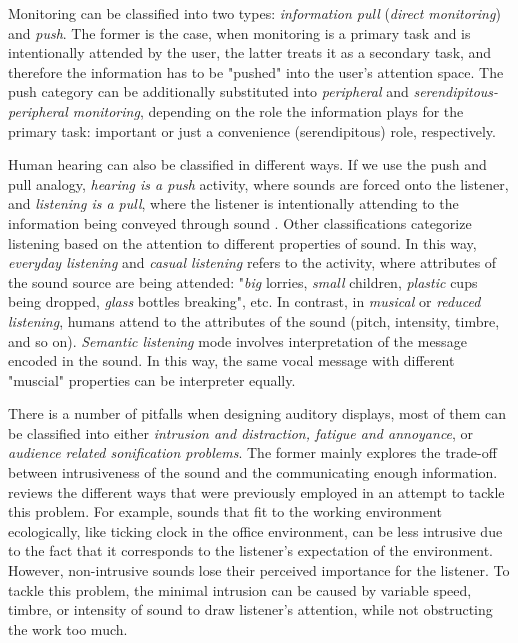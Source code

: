 Monitoring can be classified into two types: \textit{information pull} (\textit{direct monitoring}) and \textit{push}. The former is the case, when monitoring is a primary task and is intentionally attended by the user, the latter treats it as a secondary task, and therefore the information has to be "pushed" into the user's attention space. The push category can be additionally substituted into \textit{peripheral} and \textit{serendipitous-peripheral monitoring}, depending on the role the information plays for the primary task: important or just a convenience (serendipitous) role, respectively.

Human hearing can also be classified in different ways. If we use the push and pull analogy, \textit{hearing is a push} activity, where sounds are forced onto the listener, and \textit{listening is a pull}, where the listener is intentionally attending to the information being conveyed through sound \cite{hermann_sonification_2011}. Other classifications categorize listening based on the attention to different properties of sound. In this way, \textit{everyday listening} and \textit{casual listening} refers to the activity, where attributes of the sound source are being attended: "\textit{big} lorries, \textit{small }children, \textit{plastic }cups being dropped, \textit{glass }bottles breaking", etc. In contrast, in \textit{musical} or \textit{reduced listening}, humans attend to the attributes of the sound (pitch, intensity, timbre, and so on). \textit{Semantic listening} mode involves interpretation of the message encoded in the sound. In this way, the same vocal message with different "muscial" properties can be interpreter equally.


There is a number of pitfalls when designing auditory displays, most of them can be classified into either \textit{intrusion and distraction, fatigue and annoyance}, or \textit{audience related sonification problems}.
The former mainly explores the trade-off between intrusiveness of the sound and the communicating enough information. \cite{hermann_sonification_2011} reviews the different ways that were previously employed in an attempt to tackle this problem. For example, sounds that fit to the working environment ecologically, like ticking clock in the office environment, can be less intrusive due to the fact that it corresponds to the listener's expectation of the environment. However, non-intrusive sounds lose their perceived importance for the listener. To tackle this problem, the minimal intrusion can be caused by variable speed, timbre, or intensity of sound to draw listener's attention, while not obstructing the work too much.


